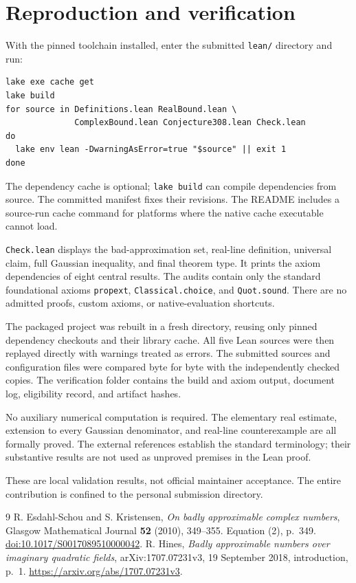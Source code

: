 \documentclass[11pt]{article}
\begin{document}
\section{Reproduction and verification}
With the pinned toolchain installed, enter the submitted \texttt{lean/} directory and run:
\begin{verbatim}
lake exe cache get
lake build
for source in Definitions.lean RealBound.lean \
              ComplexBound.lean Conjecture308.lean Check.lean
do
  lake env lean -DwarningAsError=true "$source" || exit 1
done
\end{verbatim}
The dependency cache is optional; \texttt{lake build} can compile dependencies from source. The committed manifest fixes their revisions. The README includes a source-run cache command for platforms where the native cache executable cannot load.

\texttt{Check.lean} displays the bad-approximation set, real-line definition, universal claim, full Gaussian inequality, and final theorem type. It prints the axiom dependencies of eight central results. The audits contain only the standard foundational axioms \texttt{propext}, \texttt{Classical.choice}, and \texttt{Quot.sound}. There are no admitted proofs, custom axioms, or native-evaluation shortcuts.

The packaged project was rebuilt in a fresh directory, reusing only pinned dependency checkouts and their library cache. All five Lean sources were then replayed directly with warnings treated as errors. The submitted sources and configuration files were compared byte for byte with the independently checked copies. The verification folder contains the build and axiom output, document log, eligibility record, and artifact hashes.

No auxiliary numerical computation is required. The elementary real estimate, extension to every Gaussian denominator, and real-line counterexample are all formally proved. The external references establish the standard terminology; their substantive results are not used as unproved premises in the Lean proof.

These are local validation results, not official maintainer acceptance. The entire contribution is confined to the personal submission directory.

\begin{thebibliography}{9}
R. Esdahl-Schou and S. Kristensen,
\emph{On badly approximable complex numbers},
Glasgow Mathematical Journal \textbf{52} (2010), 349--355.
Equation (2), p.~349.
\href{https://doi.org/10.1017/S0017089510000042}{doi:10.1017/S0017089510000042}.
\bibitem{Hines}
R. Hines, \emph{Badly approximable numbers over imaginary quadratic fields},
arXiv:1707.07231v3, 19 September 2018, introduction, p.~1.
\url{https://arxiv.org/abs/1707.07231v3}.
\end{thebibliography}
\end{document}
